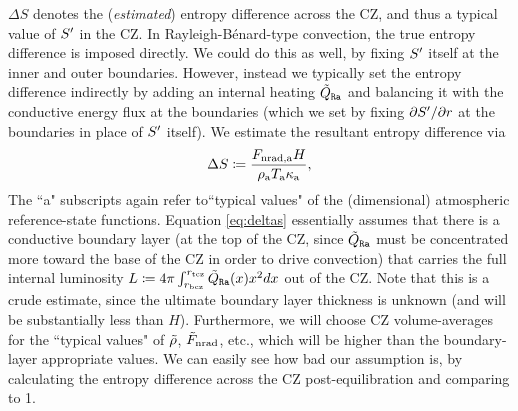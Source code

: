 \documentclass[12pt]{article}
\numberwithin{equation}{section}
\newcommand{\tmpa}{T_{\rm a}}
\newcommand{\rhoa}{\rho_{\rm a}}
\newcommand{\kappaa}{\kappa_{\rm a}}
\newcommand{\fnrada}{F_{\rm{nrad,a}}}
\begin{document}
	$\Delta S$ denotes the (\textit{estimated}) entropy difference across the CZ, and thus a typical value of ${S^\prime}$ in the CZ. In Rayleigh-B\'enard-type convection, the true entropy difference is imposed directly. We could do this as well, by fixing ${S^\prime}$ itself at the inner and outer boundaries. However, instead we typically set the entropy difference indirectly by adding an internal heating $\tilde{Q}_{\texttt{Ra}}$ and balancing it with the conductive energy flux at the boundaries (which we set by fixing $\partial{S^\prime}/\partial r$ at the boundaries in place of ${S^\prime}$ itself). We estimate the resultant entropy difference via
	\begin{align}\label{eq:deltas}
		\Delta S \define \frac{\fnrada H}{\rhoa\tmpa\kappaa},
	\end{align}
	The ``a" subscripts again refer to``typical values" of the (dimensional) atmospheric reference-state functions. Equation \eqref{eq:deltas} essentially assumes that there is a conductive boundary layer (at the top of the CZ, since $\tilde{Q}_{\texttt{Ra}}$ must be concentrated more toward the base of the CZ in order to drive convection) that carries the full internal luminosity $L\coloneqq 4\pi \int_{r_{\rm bcz}}^{r_{\rm tcz}}\tilde{Q}_{\texttt{Ra}}(x)x^2dx$ out of the CZ. Note that this is a crude estimate, since the ultimate boundary layer thickness is unknown (and will be substantially less than $H$). Furthermore, we will choose CZ volume-averages for the ``typical values" of $\tilde{\rho}$, $\tilde{F}_{\rm nrad}$, etc., which will be higher than the boundary-layer appropriate values. We can easily see how bad our assumption is, by calculating the entropy difference across the CZ post-equilibration and comparing to 1. 
	
\end{document}
